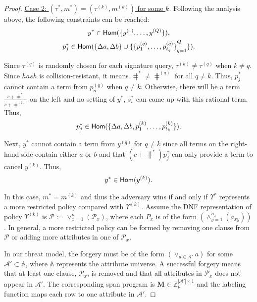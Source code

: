 \begin{proof}
\noindent\underline{Case 2: $(\tau^\ast, m^\ast) = (\tau^{(k)}, m^{(k)})$ for some $k$}. Following the analysis above, the following constraints can be reached:
\begin{gather*}
  y^\ast \in \textsf{Hom}(\{y^{(1)}, \dots, y^{(Q)}\}), \\
  p_j^\ast \in \textsf{Hom}( \{\Delta a, \Delta b\} \cup \{ {\{p_1^{(q)}, \dots, p_{t_q}^{(q)}  \}}_{q=1}^Q\} ).
\end{gather*}

Since $\tau^{(q)}$ is randomly chosen for each signature query, $\tau^{(k)} \neq \tau^{(q)}$ when $k\neq q$. Since $hash$ is collision-resistant, it means $\hash^\ast \neq \hash^{(q)}$ for all $q\neq k$. Thus, $p_j^\ast$ cannot contain a term from $p_n^{(q)}$ when $q\neq k$. Otherwise, there will be a term $\frac{c+\hash^\ast}{c+\hash^{(q)}}$ on the left and no setting of $y^\ast$, $s_i^\ast$ can come up with this rational term. Thus,
\begin{align*}
  p_j^\ast \in \textsf{Hom}( \{\Delta a, \Delta b, p_1^{(k)}, \dots, p_{t_k}^{(k)}\} ).
\end{align*}

Next, $y^\ast$ cannot contain a term from $y^{(q)}$ for $q\neq k$ since all terms on the right-hand side contain either $a$ or $b$ and that $(c+\hash^\ast)p_j^\ast$ can only provide a term to cancel $y^{(k)}$. Thus,
\begin{align*}
  y^\ast \in \textsf{Hom}(y^{(k)}).
\end{align*}

In this case, $m^\ast = m^{(k)}$ and thus the adversary wins if and only if $\Upsilon^\ast$ represents a more restricted policy compared with $\Upsilon^{(k)}$. Assume the DNF representation of policy $\Upsilon^{(k)}$ is $\mathcal{P}:=\vee_{x=1}^{n}(\mathcal{P}_x)$, where each $P_x$ is of the form $(\wedge_{y=1}^{n_x} (a_{xy}))$. In general, a more restricted policy can be formed by removing one clause from $\mathcal{P}$ or adding more attributes in one of $\mathcal{P}_x$.

In our threat model, the forgery must be of the form $(\lor_{a \in \mathcal{A}'} a)$ for some $\mathcal{A'} \subset \mathbb{A}$, where $\mathbb{A}$ represents the attribute universe. A successful forgery means that at least one clause, $\mathcal{P}_x$, is removed and that all attributes in $\mathcal{P}_x$ does not appear in $\mathcal{A}'$. The corresponding span program is $\mathbf{M} \in \mathbb{Z}_p^{|\mathcal{A}'| \times 1}$ and the labeling function maps each row to one attribute in $\mathcal{A}'$.


\end{proof}
